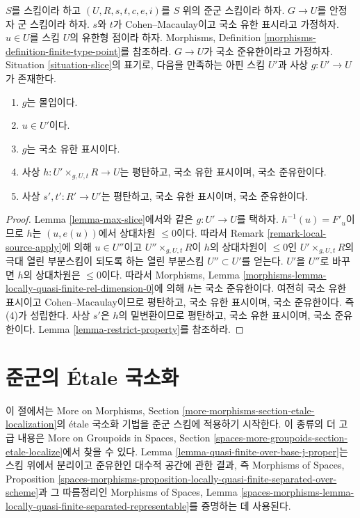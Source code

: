 \begin{lemma}
\label{lemma-max-slice-quasi-finite}
$S$를 스킴이라 하고 $(U, R, s, t, c, e, i)$를 $S$ 위의 준군 스킴이라 하자.
$G \to U$를 안정자 군 스킴이라 하자. $s$와 $t$가 Cohen--Macaulay이고
국소 유한 표시라고 가정하자. $u \in U$를 스킴 $U$의 유한형 점이라 하자.
Morphisms, Definition \ref{morphisms-definition-finite-type-point}를 참조하라.
$G \to U$가 국소 준유한이라고 가정하자. Situation
\ref{situation-slice}의 표기로, 다음을 만족하는 아핀 스킴 $U'$과 사상
$g : U' \to U$가 존재한다.
\begin{enumerate}
\item $g$는 몰입이다.
\item $u \in U'$이다.
\item $g$는 국소 유한 표시이다.
\item 사상 $h : U' \times_{g, U, t} R \longrightarrow U$는 평탄하고,
국소 유한 표시이며, 국소 준유한이다.
\item 사상 $s', t' : R' \to U'$는 평탄하고, 국소 유한 표시이며,
국소 준유한이다.
\end{enumerate}
\end{lemma}

\begin{proof}
Lemma \ref{lemma-max-slice}에서와 같은 $g : U' \to U$를 택하자.
$h^{-1}(u) = F'_u$이므로 $h$는 $(u, e(u))$에서 상대차원 $\leq 0$이다.
따라서 Remark \ref{remark-local-source-apply}에 의해 $u \in U''$이고
$U'' \times_{g, U, t} R$이 $h$의 상대차원이 $\leq 0$인
$U' \times_{g, U, t} R$의 극대 열린 부분스킴이 되도록 하는 열린 부분스킴
$U'' \subset U'$를 얻는다. $U'$을 $U''$로 바꾸면 $h$의 상대차원은
$\leq 0$이다. 따라서 Morphisms, Lemma
\ref{morphisms-lemma-locally-quasi-finite-rel-dimension-0}에 의해 $h$는
국소 준유한이다. 여전히 국소 유한 표시이고 Cohen--Macaulay이므로 평탄하고,
국소 유한 표시이며, 국소 준유한이다. 즉 (4)가 성립한다. 사상 $s'$은 $h$의
밑변환이므로 평탄하고, 국소 유한 표시이며, 국소 준유한이다. Lemma
\ref{lemma-restrict-property}를 참조하라.
\end{proof}







\section{준군의 \'Etale 국소화}
\label{section-etale-localize}

\noindent
이 절에서는 More on Morphisms, Section
\ref{more-morphisms-section-etale-localization}의 \'etale 국소화 기법을
준군 스킴에 적용하기 시작한다. 이 종류의 더 고급 내용은 More on Groupoids
in Spaces, Section \ref{spaces-more-groupoids-section-etale-localize}에서 찾을 수 있다.
Lemma \ref{lemma-quasi-finite-over-base-j-proper}는 스킴 위에서 분리이고
준유한인 대수적 공간에 관한 결과, 즉 Morphisms of Spaces, Proposition
\ref{spaces-morphisms-proposition-locally-quasi-finite-separated-over-scheme}과
그 따름정리인 Morphisms of Spaces, Lemma
\ref{spaces-morphisms-lemma-locally-quasi-finite-separated-representable}를
증명하는 데 사용된다.

